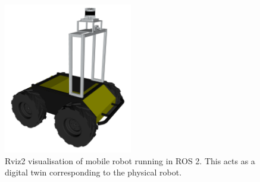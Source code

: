 \begin{figure}[htp]
  \centering
  \includegraphics[width = 0.5\textwidth]{Figures/figHuskyRviz.pdf}
  \caption{Rviz2 visualisation of mobile robot running in ROS 2. This acts as a digital twin corresponding to the physical robot.}
  \label{fig:M:AN:MC:digitalTwin}
\end{figure}






